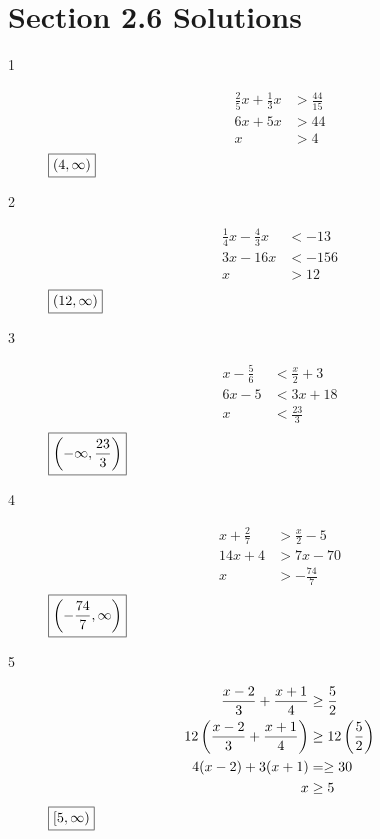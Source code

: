 \documentclass[letterpaper]{exam}
\begin{document}
  \ifprintanswers{}

    \newpage

    \section{Section 2.6 Solutions} 

    \begin{description}

      \item[1] 
        \begin{align*}
          \frac{2}{5} x + \frac{1}{3} x & > \frac{44}{15} \\
          6x + 5x                       & > 44 \\
          x                             & > 4 \\
        \end{align*}
        $\boxed{ \intoo{ 4, \infty } }$

      \item[2] 
        \begin{align*}
          \frac{1}{4} x - \frac{4}{3} x & < -13 \\
          3 x - 16 x                    & < -156 \\
          x                             & > 12 \\
        \end{align*}
        $\boxed{ \intoo{ 12, \infty } }$

      \item[3] 
        \begin{align*}
          x - \frac{5}{6} & < \frac{x}{2} + 3 \\
          6x - 5          & < 3x + 18 \\
          x               & < \frac{23}{3} \\
        \end{align*}
        $\boxed{ \intoo{ -\infty, \frac{23}{3} } }$

      \item[4] 
        \begin{align*}
          x + \frac{2}{7} & > \frac{x}{2} - 5 \\
          14x + 4         & > 7x - 70 \\
          x               & > - \frac{74}{7} \\
        \end{align*}
        $\boxed{ \intoo{ - \frac{74}{7}, \infty } }$

      \item[5]
        \begin{align*}
          \frac{x-2}{3} + \frac{x+1}{4}          & \geq \frac{5}{2} \\
          12 \del{\frac{x-2}{3} + \frac{x+1}{4}} & \geq 12 \del{\frac{5}{2}} \\
          4 (x - 2) + 3(x + 1)                   & = \geq 30 \\
          x                                      & \geq 5 \\
        \end{align*}
        $\boxed{ \intco{ 5, \infty } }$


\end{description}
\end{document}
